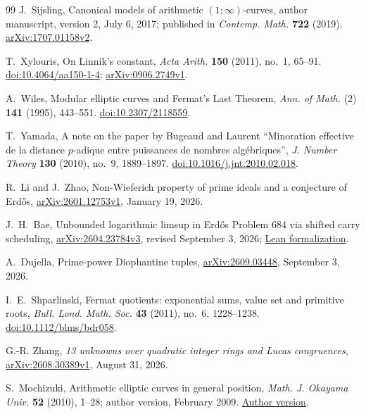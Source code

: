 \documentclass[11pt]{amsart}
\theoremstyle{definition}
\theoremstyle{remark}
\begin{document}
\begin{thebibliography}{99}
J.~Sijsling, Canonical models of arithmetic $(1;\infty)$-curves,
author manuscript, version 2, July 6, 2017;
published in \emph{Contemp. Math.} \textbf{722} (2019).
\href{https://arxiv.org/abs/1707.01158v2}{arXiv:1707.01158v2}.

T.~Xylouris, On Linnik's constant,
\emph{Acta Arith.} \textbf{150} (2011), no.~1, 65--91.
\href{https://doi.org/10.4064/aa150-1-4}{doi:10.4064/aa150-1-4};
\href{https://arxiv.org/abs/0906.2749v1}{arXiv:0906.2749v1}.

A.~Wiles,
Modular elliptic curves and Fermat's Last Theorem,
\emph{Ann. of Math.} (2) \textbf{141} (1995), 443--551.
\href{https://doi.org/10.2307/2118559}{doi:10.2307/2118559}.

T.~Yamada,
A note on the paper by Bugeaud and Laurent ``Minoration effective de la
distance $p$-adique entre puissances de nombres alg\'ebriques'',
\emph{J. Number Theory} \textbf{130} (2010), no.~9, 1889--1897.
\href{https://doi.org/10.1016/j.jnt.2010.02.018}%
{doi:10.1016/j.jnt.2010.02.018}.

R.~Li and J.~Zhao,
Non-Wieferich property of prime ideals and a conjecture of Erd\H{o}s,
\href{https://arxiv.org/abs/2601.12753v1}{arXiv:2601.12753v1},
January 19, 2026.

J.~H.~Bae,
Unbounded logarithmic limsup in Erd\H{o}s Problem 684 via shifted carry
scheduling,
\href{https://arxiv.org/abs/2604.23784v3}{arXiv:2604.23784v3},
revised September 3, 2026;
\href{https://github.com/jidodat/erdos684-lean}{Lean formalization}.

A.~Dujella,
Prime-power Diophantine tuples,
\href{https://arxiv.org/abs/2609.03448}{arXiv:2609.03448},
September 3, 2026.

I.~E.~Shparlinski,
Fermat quotients: exponential sums, value set and primitive roots,
\emph{Bull. Lond. Math. Soc.} \textbf{43} (2011), no.~6, 1228--1238.
\href{https://doi.org/10.1112/blms/bdr058}{doi:10.1112/blms/bdr058}.

G.-R. Zhang,
\emph{13 unknowns over quadratic integer rings and Lucas congruences},
\href{https://arxiv.org/abs/2608.30389v1}{arXiv:2608.30389v1},
August 31, 2026.

S.~Mochizuki, Arithmetic elliptic curves in general position,
\emph{Math. J. Okayama Univ.} \textbf{52} (2010), 1--28;
author version, February 2009.
\href{https://www.kurims.kyoto-u.ac.jp/~motizuki/Arithmetic\%20Elliptic\%20Curves\%20in\%20General\%20Position.pdf}{Author version}.


\end{thebibliography}
\end{document}
